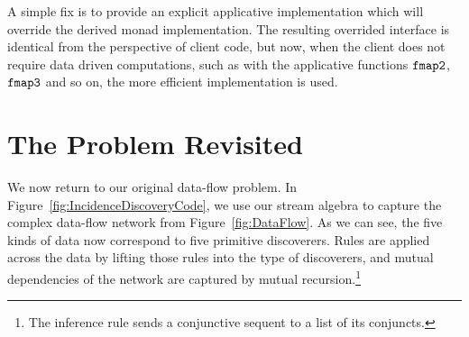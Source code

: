 A simple fix is to provide an explicit applicative implementation which will override the derived monad implementation. The resulting overrided interface is identical from the perspective of client code, but now, when the client does not require data driven computations, such as with the applicative functions $\texttt{fmap2}$, $\texttt{fmap3}$ and so on, the more efficient implementation is used.

\section{The Problem Revisited}\label{sec:Solution}
We now return to our original data-flow problem. In Figure~\ref{fig:IncidenceDiscoveryCode}, we use our stream algebra to capture the complex data-flow network from Figure~\ref{fig:DataFlow}. As we can see, the five kinds of data now correspond to five primitive discoverers. Rules are applied across the data by lifting those rules into the type of discoverers, and mutual dependencies of the network are captured by mutual recursion.\footnote{The inference rule  sends a conjunctive sequent to a list of its conjuncts.}
